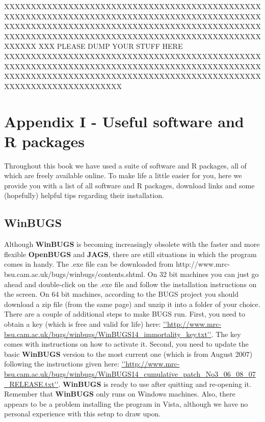 XXXXXXXXXXXXXXXXXXXXXXXXXXXXXXXXXXXXXXXXXXXXXXXXXXXXXXXXXXXXXXXXXXXXXXXXXXXXXXXXXXXXXXXXXXXXXXXXXXXXXXXXXXXXXXXXXXXXXXXXXXXXXXXXXXXXXXXXXXXXXXXXXXXXXXXXXXXXXXXXXXXXXXXXXXXXXXXXXXXXXXXXXXXXXXXXXXXXXX
XXX PLEASE DUMP YOUR STUFF HERE XXXXXXXXXXXXXXXXXXXXXXXXXXXXXXXXXXXXXXXXXXXXXXXXXXXXXXXXXXXXXXXXXXXXXXXXXXXXXXXXXXXXXXXXXXXXXXXXXXXXXXXXXXXXXXXXXXXXXXXXXXXXXXXXXXXXXXXXXXXXXXXXXXXXXXXXXXXXXXXXXXXXXX



\chapter{Appendix I - Useful software and R packages}
\label{chapt.app1}

\vspace{.3in}

Throughout this book we have used a suite of software and R packages, all of which are freely available online. To make life a little easier for you, here we provide you with a list of all software and R packages, download links and some (hopefully) helpful tips regarding their installation.  


\section{WinBUGS}
Although {\bf WinBUGS} \citep{gilks_etal:1994} is becoming increasingly obsolete with the faster and more flexible {\bf OpenBUGS} and {\bf JAGS}, there are still situations in which the program comes in handy.  
The .exe file can be downloaded from http://www.mrc-bsu.cam.ac.uk/bugs/winbugs/contents.shtml. On 32 bit machines you can just go ahead and double-click on the .exe file and follow the installation instructions on the screen.
On 64 bit machines, according to the BUGS project you should download a zip file (from the same page) and unzip it into a folder of your choice.
There are a couple of additional steps to make BUGS run. 
First, you need to obtain a key (which is free and valid for life) here: \url{''http://www.mrc-bsu.cam.ac.uk/bugs/winbugs/WinBUGS14_immortality_key.txt''}. The key comes with instructions on how to activate it.
Second, you need to update the basic {\bf WinBUGS} version to the most current one (which is from August 2007) following the instructions given here: \url{''http://www.mrc-bsu.cam.ac.uk/bugs/winbugs/WinBUGS14_cumulative_patch_No3_06_08_07_RELEASE.txt''}.
{\bf WinBUGS} is ready to use after quitting and re-opening it.
Remember that {\bf WinBUGS} only runs on Windows machines. Also, there appears to be a problem installing the program in Vista, although we have no personal experience with this setup to draw upon.

